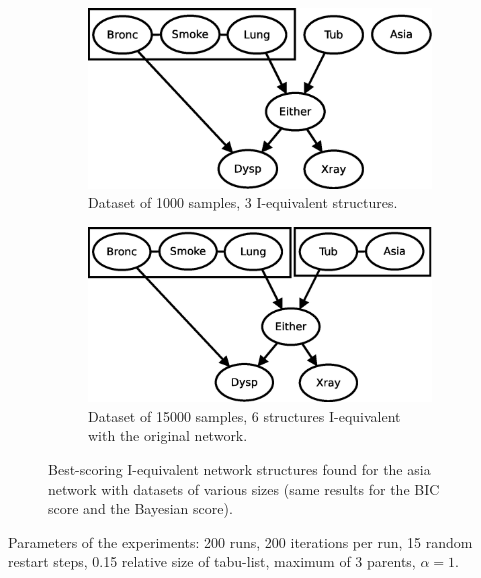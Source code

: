 \documentclass[english,cover]{fitthesis} %
\begin{document}
\begin{figure}[ht]
    \centering
    \begin{subfigure}[b]{0.45\linewidth}
        \includegraphics[scale=0.4]{fig/structure-learning-asia-1000}
        \caption{Dataset of 1000 samples, 3 I-equivalent structures.}
        \label{fig:structure-learning-asia-1000}
    \end{subfigure}
    \qquad
    \begin{subfigure}[b]{0.45\linewidth}
        \centering
        \includegraphics[scale=0.4]{fig/structure-learning-asia-15000}
        \caption{Dataset of 15000 samples, 6 structures I-equivalent with the original network.}
        \label{fig:structure-learning-asia-15000}
    \end{subfigure}
    \caption{Best-scoring I-equivalent network structures found for the asia network with datasets of various sizes (same results for the BIC score and the Bayesian score).}
    \label{fig:structure-learning-asia}
\end{figure}

Parameters of the experiments: 200 runs, 200 iterations per run, 15 random restart steps, 0.15 relative size of tabu-list, maximum of 3 parents, $\alpha=1$.
\end{document}
